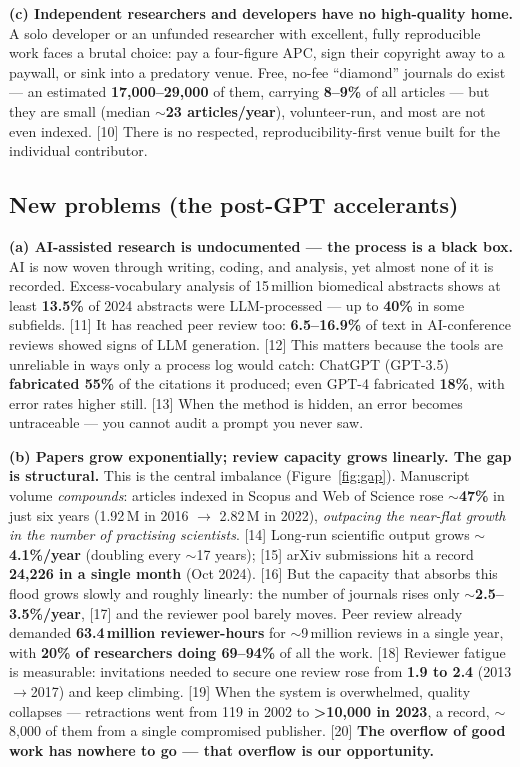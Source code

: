 \documentclass[11pt]{article}
\newcommand{\stat}[1]{{\sffamily\bfseries\color{accent}#1}}
\newcommand{\src}[1]{{\footnotesize\color{ink3}[#1]}}
\begin{document}
\textbf{(c) Independent researchers and developers have no high-quality home.}
A solo developer or an unfunded researcher with excellent, fully reproducible work faces a brutal choice: pay a four-figure APC, sign their copyright away to a paywall, or sink into a predatory venue. Free, no-fee ``diamond'' journals do exist --- an estimated \stat{17{,}000--29{,}000} of them, carrying \stat{8--9\%} of all articles --- but they are small (median \stat{$\sim$23 articles/year}), volunteer-run, and most are not even indexed. \src{10} There is no respected, reproducibility-first venue built for the individual contributor.

\subsection{New problems (the post-GPT accelerants)}

\textbf{(a) AI-assisted research is undocumented --- the process is a black box.}
AI is now woven through writing, coding, and analysis, yet almost none of it is recorded. Excess-vocabulary analysis of 15\,million biomedical abstracts shows at least \stat{13.5\%} of 2024 abstracts were LLM-processed --- up to \stat{40\%} in some subfields. \src{11} It has reached peer review too: \stat{6.5--16.9\%} of text in AI-conference reviews showed signs of LLM generation. \src{12} This matters because the tools are unreliable in ways only a process log would catch: ChatGPT (GPT-3.5) \stat{fabricated 55\%} of the citations it produced; even GPT-4 fabricated \stat{18\%}, with error rates higher still. \src{13} When the method is hidden, an error becomes untraceable --- you cannot audit a prompt you never saw.

\textbf{(b) Papers grow exponentially; review capacity grows linearly. The gap is structural.}
This is the central imbalance (Figure~\ref{fig:gap}). Manuscript volume \emph{compounds}: articles indexed in Scopus and Web of Science rose \stat{$\sim$47\%} in just six years (1.92\,M in 2016 $\to$ 2.82\,M in 2022), \emph{outpacing the near-flat growth in the number of practising scientists}. \src{14} Long-run scientific output grows \stat{$\sim$4.1\%/year} (doubling every $\sim$17 years); \src{15} arXiv submissions hit a record \stat{24{,}226 in a single month} (Oct 2024). \src{16} But the capacity that absorbs this flood grows slowly and roughly linearly: the number of journals rises only \stat{$\sim$2.5--3.5\%/year}, \src{17} and the reviewer pool barely moves. Peer review already demanded \stat{63.4\,million reviewer-hours} for $\sim$9\,million reviews in a single year, with \stat{20\% of researchers doing 69--94\%} of all the work. \src{18} Reviewer fatigue is measurable: invitations needed to secure one review rose from \stat{1.9 to 2.4} (2013$\to$2017) and keep climbing. \src{19} When the system is overwhelmed, quality collapses --- retractions went from 119 in 2002 to \stat{>10{,}000 in 2023}, a record, $\sim$8{,}000 of them from a single compromised publisher. \src{20} \textbf{The overflow of good work has nowhere to go --- that overflow is our opportunity.}
\end{document}
